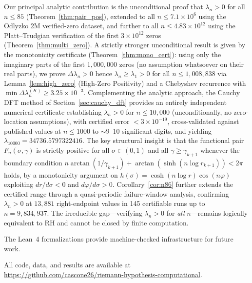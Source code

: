 \documentclass[11pt]{article}
\begin{document}
Our principal analytic contribution is the unconditional proof that $\lambda_n > 0$ for
all $n \le 85$ (Theorem~\ref{thm:pair_pos}), extended to all $n \le 7.1\times10^6$
using the Odlyzko 2M verified-zero dataset, and further to all $n \le 4.83\times10^{12}$
using the Platt--Trudgian verification of the first $3\times10^{12}$ zeros \cite{platt2021}
(Theorem~\ref{thm:multi_zero}).
A strictly stronger unconditional result is given by the monotonicity certificate
(Theorem~\ref{thm:mono_cert}): using only the imaginary parts of the first $1{,}000{,}000$ zeros
(no assumption whatsoever on their real parts), we prove $\Delta\lambda_n > 0$ hence
$\lambda_n \ge \lambda_1 > 0$ for all $n \le 1{,}008{,}838$ via Lemma~\ref{lem:high_zero}
(High-Zero Positivity) and a Chebyshev recurrence with $\min\Delta\lambda_n^{(K)} \ge 3.25\times10^{-3}$.
Complementing the analytic approach, the Cauchy DFT method of
Section~\ref{sec:cauchy_dft} provides an entirely independent numerical certificate
establishing $\lambda_n > 0$ for $n \le 10{,}000$ (unconditionally, no zero-location
assumptions), with certified error $< 3\times10^{-19}$, cross-validated against
published values at $n \le 1000$ to $\sim 9$--$10$ significant digits,
and yielding $\lambda_{10000} = 34736.5797322416$.
The key structural insight is that the functional pair $F_n(\sigma,\gamma)$ is strictly
positive for all $\sigma \in (0,1)$ and all $\gamma \ge \gamma_{k+1}$ whenever the
boundary condition $n\arctan(1/\gamma_{k+1}) + \arctan(\sinh(n\log r_{k+1})) < 2\pi$ holds,
by a monotonicity argument on $h(\sigma) = \cosh(n\log r)\cos(n\varphi)$ exploiting
$dr/d\sigma < 0$ and $d\varphi/d\sigma > 0$.  Corollary~\ref{cor:n86} further
extends the certified range through a quasi-periodic failure-window analysis,
confirming $\lambda_n > 0$ at $13{,}881$ right-endpoint values in 145 certifiable runs
up to $n = 9{,}834{,}937$.  The irreducible gap---verifying $\lambda_n > 0$ for \emph{all}
$n$---remains logically equivalent to RH and cannot be closed by finite computation.

The Lean~4 formalizations provide machine-checked infrastructure for future work.

All code, data, and results are available at
\url{https://github.com/cascone26/riemann-hypothesis-computational}.
\end{document}
